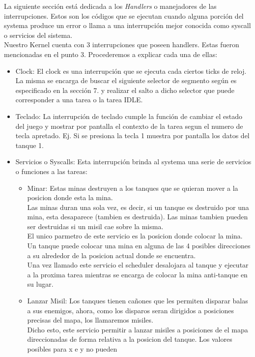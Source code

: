 La siguiente secci\'on est\'a dedicada a los \emph{Handlers} o manejadores de las interrupciones. Estos son los c\'odigos que se ejecutan
cuando alguna porci\'on del systema produce un error o llama a una interrupci\'on mejor conocida como syscall o servicios del sistema.\\
Nuestro Kernel cuenta con 3 interrupciones que poseen handlers. Estas fueron mencionadas en el punto 3. Procederemos a explicar cada una de
ellas:
\begin{itemize}
 \item Clock: El clock es una interrupci\'on que se ejecuta cada ciertos ticks de reloj. La misma se encarga de buscar el siguiente selector
de segmento según es especificado en la secci\'on 7. y realizar el salto a dicho selector que puede corresponder a una tarea o 
la tarea IDLE.
 \item Teclado: La interrupci\'on de teclado cumple la funci\'on de cambiar el estado del juego y mostrar por pantalla el contexto
 de la tarea segun el numero de tecla apretado. Ej. Si se presiona la tecla 1 muestra por pantalla los datos del tanque 1.
 \item Servicios o Syscalls: Esta interrupci\'on brinda al systema una serie de servicios o funciones a las tareas:
  \begin{itemize}
   \item Minar: Estas minas destruyen a los tanques que se quieran mover a la posicion donde esta la mina.\\
   Las minas duran una sola vez, es decir, si un tanque es destruido por una mina, esta desaparece
(tambien es destruida). Las minas tambien pueden ser destruidas si un misil cae sobre la misma.\\
El unico parmetro de este servicio es la posicion donde colocar la mina. Un tanque puede colocar una mina 
en alguna de las 4 posibles direcciones a su alrededor de la posicion actual donde se encuentra.\\
Una vez llamado este servicio el scheduler desalojara al tanque y ejecutar a la proxima 
tarea mientras se encarga de colocar la mina anti-tanque en su lugar. \\
   \item Lanzar Misil: Los tanques tienen cañones que les permiten disparar balas a sus enemigos, ahora,
como los disparos seran dirigidos a posiciones precisas del mapa, los llamaremos misiles. \\
Dicho esto, este servicio permitir a lanzar misiles a posiciones de el mapa direccionadas
de forma relativa a la posicion del tanque. Los valores posibles para x e y no pueden

\end{itemize}
\end{itemize}
